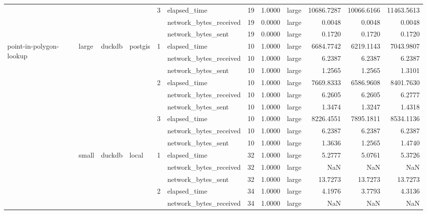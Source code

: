 \begin{tabular}{llllllrrlrrr}
\cline{5-12}
 &  &  &  & \multirow[t]{3}{*}{3} & elapsed_time & 19 & 1.0000 & large & 10686.7287 & 10066.6166 & 11463.5613 \\
 &  &  &  &  & network_bytes_received & 19 & 0.0000 & large & 0.0048 & 0.0048 & 0.0048 \\
 &  &  &  &  & network_bytes_sent & 19 & 0.0000 & large & 0.1720 & 0.1720 & 0.1720 \\
\cline{1-12} \cline{2-12} \cline{3-12} \cline{4-12} \cline{5-12}
\multirow[t]{36}{*}{point-in-polygon-lookup} & \multirow[t]{9}{*}{large} & \multirow[t]{9}{*}{duckdb} & \multirow[t]{9}{*}{postgis} & \multirow[t]{3}{*}{1} & elapsed_time & 10 & 1.0000 & large & 6684.7742 & 6219.1143 & 7043.9807 \\
 &  &  &  &  & network_bytes_received & 10 & 1.0000 & large & 6.2387 & 6.2387 & 6.2387 \\
 &  &  &  &  & network_bytes_sent & 10 & 1.0000 & large & 1.2565 & 1.2565 & 1.3101 \\
\cline{5-12}
 &  &  &  & \multirow[t]{3}{*}{2} & elapsed_time & 10 & 1.0000 & large & 7669.8333 & 6586.9608 & 8401.7630 \\
 &  &  &  &  & network_bytes_received & 10 & 1.0000 & large & 6.2605 & 6.2605 & 6.2777 \\
 &  &  &  &  & network_bytes_sent & 10 & 1.0000 & large & 1.3474 & 1.3247 & 1.4318 \\
\cline{5-12}
 &  &  &  & \multirow[t]{3}{*}{3} & elapsed_time & 10 & 1.0000 & large & 8226.4551 & 7895.1811 & 8534.1136 \\
 &  &  &  &  & network_bytes_received & 10 & 1.0000 & large & 6.2387 & 6.2387 & 6.2387 \\
 &  &  &  &  & network_bytes_sent & 10 & 1.0000 & large & 1.3636 & 1.2565 & 1.4740 \\
\cline{2-12} \cline{3-12} \cline{4-12} \cline{5-12}
 & \multirow[t]{27}{*}{small} & \multirow[t]{18}{*}{duckdb} & \multirow[t]{9}{*}{local} & \multirow[t]{3}{*}{1} & elapsed_time & 32 & 1.0000 & large & 5.2777 & 5.0761 & 5.3726 \\
 &  &  &  &  & network_bytes_received & 32 & 1.0000 & large & NaN & NaN & NaN \\
 &  &  &  &  & network_bytes_sent & 32 & 1.0000 & large & 13.7273 & 13.7273 & 13.7273 \\
\cline{5-12}
 &  &  &  & \multirow[t]{3}{*}{2} & elapsed_time & 34 & 1.0000 & large & 4.1976 & 3.7793 & 4.3136 \\
 &  &  &  &  & network_bytes_received & 34 & 1.0000 & large & NaN & NaN & NaN \\

\end{tabular}
